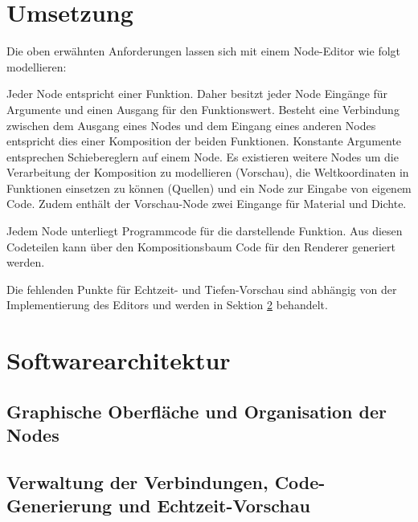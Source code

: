 \section{Umsetzung}
Die oben erwähnten Anforderungen lassen sich mit einem Node-Editor wie folgt modellieren:

Jeder Node entspricht einer Funktion. Daher besitzt jeder Node Eingänge für Argumente und einen Ausgang für den Funktionswert. Besteht eine Verbindung zwischen dem Ausgang eines Nodes und dem Eingang eines anderen Nodes entspricht dies einer Komposition der beiden Funktionen. Konstante Argumente entsprechen Schiebereglern auf einem Node. Es existieren weitere Nodes um die Verarbeitung der Komposition zu modellieren (Vorschau), die Weltkoordinaten in Funktionen einsetzen zu können (Quellen) und ein Node zur Eingabe von eigenem Code. Zudem enthält der Vorschau-Node zwei Eingange für Material und Dichte.

Jedem Node unterliegt Programmcode für die darstellende Funktion. Aus diesen Codeteilen kann über den Kompositionsbaum Code für den Renderer generiert werden.

Die fehlenden Punkte für Echtzeit- und Tiefen-Vorschau sind abhängig von der Implementierung des Editors und werden in Sektion \ref{architecture} behandelt.

\section{Softwarearchitektur}
\label{architecture}
\subsection{Graphische Oberfläche und Organisation der Nodes}
\subsection{Verwaltung der Verbindungen, Code-Generierung und Echtzeit-Vorschau}





